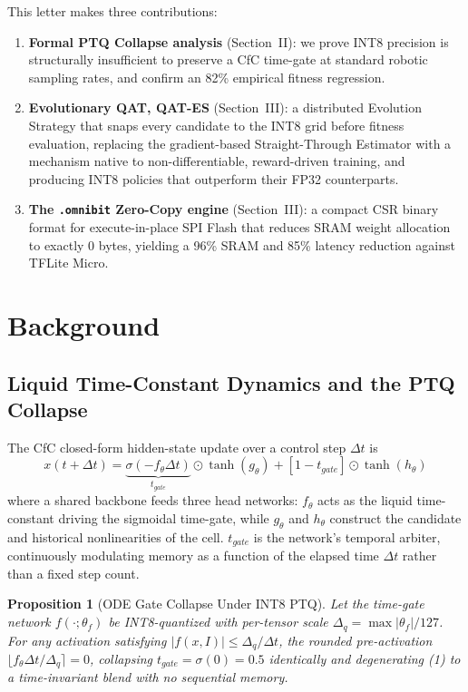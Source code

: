 \documentclass[10pt,journal]{IEEEtran}
\newtheorem{proposition}{Proposition}
\begin{document}
This letter makes three contributions:
\begin{enumerate}[leftmargin=*,noitemsep,topsep=2pt,parsep=0pt]
\item \textbf{Formal PTQ Collapse analysis} (Section~II): we prove INT8 precision is structurally insufficient to preserve a CfC time-gate at standard robotic sampling rates, and confirm an 82\% empirical fitness regression.
\item \textbf{Evolutionary QAT, QAT-ES} (Section~III): a distributed Evolution Strategy that snaps every candidate to the INT8 grid before fitness evaluation, replacing the gradient-based Straight-Through Estimator with a mechanism native to non-differentiable, reward-driven training, and producing INT8 policies that outperform their FP32 counterparts.
\item \textbf{The \texttt{.omnibit} Zero-Copy engine} (Section~III): a compact CSR binary format for execute-in-place SPI Flash that reduces SRAM weight allocation to exactly 0 bytes, yielding a 96\% SRAM and 85\% latency reduction against TFLite Micro.
\end{enumerate}

\section{Background}
\subsection{Liquid Time-Constant Dynamics and the PTQ Collapse}

The CfC closed-form hidden-state update \cite{hasani2022cfc} over a control step $\Delta t$ is
\begin{equation}
x(t+\Delta t) = \underbrace{\sigma(-f_\theta\Delta t)}_{t_{gate}}\odot\tanh(g_\theta) + [1-t_{gate}]\odot\tanh(h_\theta)
\end{equation}
where a shared backbone feeds three head networks: $f_\theta$ acts as the liquid time-constant driving the sigmoidal time-gate, while $g_\theta$ and $h_\theta$ construct the candidate and historical nonlinearities of the cell. $t_{gate}$ is the network's temporal arbiter, continuously modulating memory as a function of the elapsed time $\Delta t$ rather than a fixed step count.

\begin{proposition}[ODE Gate Collapse Under INT8 PTQ]
Let the time-gate network $f(\cdot;\theta_f)$ be INT8-quantized with per-tensor scale $\Delta_q=\max|\theta_f|/127$. For any activation satisfying $|f(x,I)|\le\Delta_q/\Delta t$, the rounded pre-activation $\lfloor f_\theta\Delta t/\Delta_q\rceil=0$, collapsing $t_{gate}=\sigma(0)=0.5$ identically and degenerating (1) to a time-invariant blend with no sequential memory.
\end{proposition}
\end{document}

